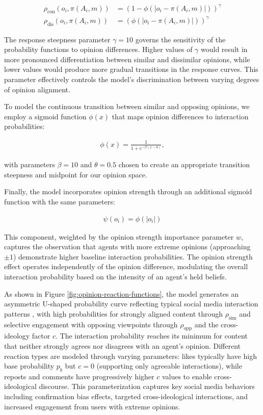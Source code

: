 \begin{align}
\rho_{\text{con}}(o_i, \pi(A_i, m)) &= (1-\phi(|o_i - \pi(A_i, m)|))^{\gamma} \\
\rho_{\text{dis}}(o_i, \pi(A_i, m)) &= (\phi(|o_i - \pi(A_i, m)|))^{\gamma}
\end{align}

The response steepness parameter $\gamma = 10$ governs the sensitivity of the probability functions to opinion differences. Higher values of $\gamma$ would result in more pronounced differentiation between similar and dissimilar opinions, while lower values would produce more gradual transitions in the response curves. This parameter effectively controls the model's discrimination between varying degrees of opinion alignment.

To model the continuous transition between similar and opposing opinions, we employ a sigmoid function $\phi(x)$ that maps opinion differences to interaction probabilities:

\begin{align}
\phi(x) = \frac{1}{1 + e^{-\beta(x - \theta)}},
\end{align}

with parameters $\beta = 10$ and $\theta = 0.5$ chosen to create an appropriate transition steepness and midpoint for our opinion space. 

Finally, the model incorporates opinion strength through an additional sigmoid function with the same parameters:

\begin{align}
\psi(o_i) = \phi(|o_i|)
\end{align}

This component, weighted by the opinion strength importance parameter $w$, captures the observation that agents with more extreme opinions (approaching $\pm 1$) demonstrate higher baseline interaction probabilities. The opinion strength effect operates independently of the opinion difference, modulating the overall interaction probability based on the intensity of an agent's held beliefs.

As shown in Figure \ref{fig:opinion-reaction-functions}, the model generates an asymmetric U-shaped probability curve reflecting typical social media interaction patterns \citep{xu_user_2018, shahbaznezhad_role_2021}, with high probabilities for strongly aligned content through $\rho_{\text{sim}}$ and selective engagement with opposing viewpoints through $\rho_{\text{opp}}$ and the cross-ideology factor $c$. The interaction probability reaches its minimum for content that neither strongly agrees nor disagrees with an agent's opinion. Different reaction types are modeled through varying parameters: likes typically have high base probability $p_b$ but $c=0$ (supporting only agreeable interactions), while reposts and comments have progressively higher $c$ values to enable cross-ideological discourse. This parameterization captures key social media behaviors including confirmation bias effects, targeted cross-ideological interactions, and increased engagement from users with extreme opinions.

